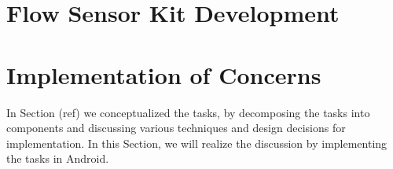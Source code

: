 \section{Flow Sensor Kit Development}

\section{Implementation of Concerns}
In Section (ref) we conceptualized the tasks, by decomposing the tasks into components and discussing various techniques and design decisions for implementation. In this Section, we will realize the discussion by implementing the tasks in Android. 



